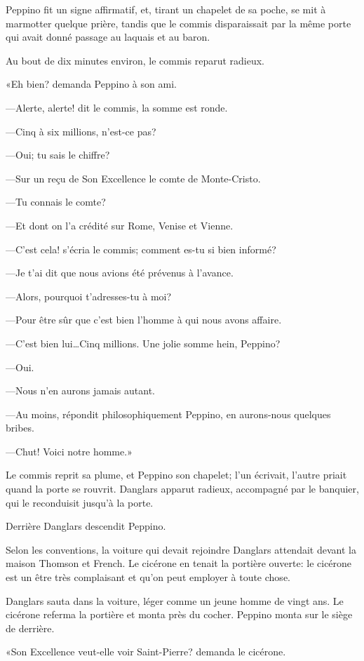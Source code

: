 Peppino fit un signe affirmatif, et, tirant un chapelet de sa poche, se mit à marmotter quelque prière, tandis que le commis disparaissait par la même porte qui avait donné passage au laquais et au baron. 

Au bout de dix minutes environ, le commis reparut radieux. 

«Eh bien? demanda Peppino à son ami. 

—Alerte, alerte! dit le commis, la somme est ronde. 

—Cinq à six millions, n'est-ce pas? 

—Oui; tu sais le chiffre? 

—Sur un reçu de Son Excellence le comte de Monte-Cristo. 

—Tu connais le comte? 

—Et dont on l'a crédité sur Rome, Venise et Vienne. 

—C'est cela! s'écria le commis; comment es-tu si bien informé? 

—Je t'ai dit que nous avions été prévenus à l'avance. 

—Alors, pourquoi t'adresses-tu à moi? 

—Pour être sûr que c'est bien l'homme à qui nous avons affaire. 

—C'est bien lui\dots Cinq millions. Une jolie somme hein, Peppino? 

—Oui. 

—Nous n'en aurons jamais autant. 

—Au moins, répondit philosophiquement Peppino, en aurons-nous quelques bribes. 

—Chut! Voici notre homme.» 

Le commis reprit sa plume, et Peppino son chapelet; l'un écrivait, l'autre priait quand la porte se rouvrit. Danglars apparut radieux, accompagné par le banquier, qui le reconduisit jusqu'à la porte. 

Derrière Danglars descendit Peppino. 

Selon les conventions, la voiture qui devait rejoindre Danglars attendait devant la maison Thomson et French. Le cicérone en tenait la portière ouverte: le cicérone est un être très complaisant et qu'on peut employer à toute chose. 

Danglars sauta dans la voiture, léger comme un jeune homme de vingt ans. Le cicérone referma la portière et monta près du cocher. Peppino monta sur le siège de derrière. 

«Son Excellence veut-elle voir Saint-Pierre? demanda le cicérone. 

